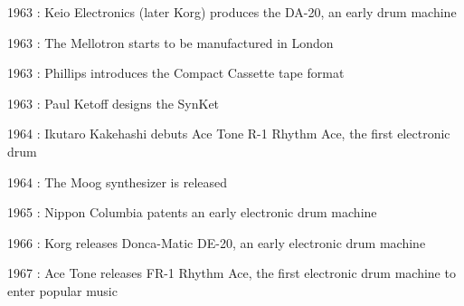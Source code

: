 \documentclass[12pt]{report}
\begin{document}
\begin{adjustwidth}{0.5in}{0.0in}
1963 : Keio Electronics (later Korg) produces the DA-20, an early drum machine\par

\end{adjustwidth}

\begin{adjustwidth}{0.5in}{0.0in}
1963 : The Mellotron starts to be manufactured in London\par

\end{adjustwidth}

\begin{adjustwidth}{0.5in}{0.0in}
1963 : Phillips introduces the Compact Cassette tape format\par

\end{adjustwidth}

\begin{adjustwidth}{0.5in}{0.0in}
1963 : Paul Ketoff designs the SynKet\par

\end{adjustwidth}

\begin{adjustwidth}{0.5in}{0.0in}
1964 : Ikutaro Kakehashi debuts Ace Tone R-1 Rhythm Ace, the first electronic drum\par

\end{adjustwidth}

\begin{adjustwidth}{0.5in}{0.0in}
1964 : The Moog synthesizer is released\par

\end{adjustwidth}

\begin{adjustwidth}{0.5in}{0.0in}
1965 : Nippon Columbia patents an early electronic drum machine\par

\end{adjustwidth}

\begin{adjustwidth}{0.5in}{0.0in}
1966 : Korg releases Donca-Matic DE-20, an early electronic drum machine\par

\end{adjustwidth}

\begin{adjustwidth}{0.5in}{0.0in}
1967 : Ace Tone releases FR-1 Rhythm Ace, the first electronic drum machine to enter popular music\par

\end{adjustwidth}
\end{document}
